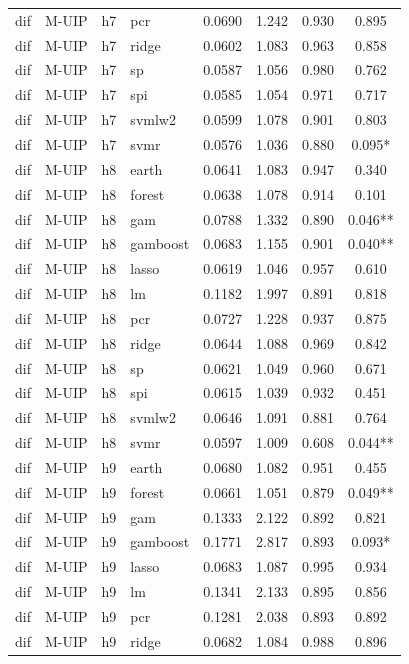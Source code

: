 \begin{ThreePartTable}
\begin{longtable}[t]{llclcccc}
dif & M-UIP & h7 & pcr & 0.0690 & 1.242 & 0.930 & 0.895\\
dif & M-UIP & h7 & ridge & 0.0602 & 1.083 & 0.963 & 0.858\\
dif & M-UIP & h7 & sp & 0.0587 & 1.056 & 0.980 & 0.762\\
dif & M-UIP & h7 & spi & 0.0585 & 1.054 & 0.971 & 0.717\\
dif & M-UIP & h7 & svmlw2 & 0.0599 & 1.078 & 0.901 & 0.803\\
dif & M-UIP & h7 & svmr & 0.0576 & 1.036 & 0.880 & 0.095*\\
\addlinespace
dif & M-UIP & h8 & earth & 0.0641 & 1.083 & 0.947 & 0.340\\
dif & M-UIP & h8 & forest & 0.0638 & 1.078 & 0.914 & 0.101\\
dif & M-UIP & h8 & gam & 0.0788 & 1.332 & 0.890 & 0.046**\\
dif & M-UIP & h8 & gamboost & 0.0683 & 1.155 & 0.901 & 0.040**\\
dif & M-UIP & h8 & lasso & 0.0619 & 1.046 & 0.957 & 0.610\\
dif & M-UIP & h8 & lm & 0.1182 & 1.997 & 0.891 & 0.818\\
dif & M-UIP & h8 & pcr & 0.0727 & 1.228 & 0.937 & 0.875\\
dif & M-UIP & h8 & ridge & 0.0644 & 1.088 & 0.969 & 0.842\\
dif & M-UIP & h8 & sp & 0.0621 & 1.049 & 0.960 & 0.671\\
dif & M-UIP & h8 & spi & 0.0615 & 1.039 & 0.932 & 0.451\\
dif & M-UIP & h8 & svmlw2 & 0.0646 & 1.091 & 0.881 & 0.764\\
dif & M-UIP & h8 & svmr & 0.0597 & 1.009 & 0.608 & 0.044**\\
\addlinespace
dif & M-UIP & h9 & earth & 0.0680 & 1.082 & 0.951 & 0.455\\
dif & M-UIP & h9 & forest & 0.0661 & 1.051 & 0.879 & 0.049**\\
dif & M-UIP & h9 & gam & 0.1333 & 2.122 & 0.892 & 0.821\\
dif & M-UIP & h9 & gamboost & 0.1771 & 2.817 & 0.893 & 0.093*\\
dif & M-UIP & h9 & lasso & 0.0683 & 1.087 & 0.995 & 0.934\\
dif & M-UIP & h9 & lm & 0.1341 & 2.133 & 0.895 & 0.856\\
dif & M-UIP & h9 & pcr & 0.1281 & 2.038 & 0.893 & 0.892\\
dif & M-UIP & h9 & ridge & 0.0682 & 1.084 & 0.988 & 0.896\\

\end{longtable}
\end{ThreePartTable}
